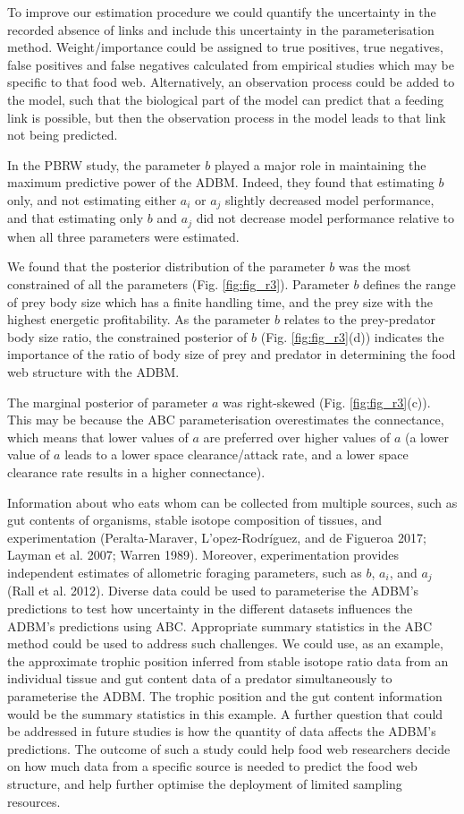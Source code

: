 \documentclass{article}
\begin{document}
To improve our estimation procedure we could quantify the uncertainty in
the recorded absence of links and include this uncertainty in the
parameterisation method. Weight/importance could be assigned to true
positives, true negatives, false positives and false negatives
calculated from empirical studies which may be specific to that food
web. Alternatively, an observation process could be added to the model,
such that the biological part of the model can predict that a feeding
link is possible, but then the observation process in the model leads to
that link not being predicted.

In the PBRW study, the parameter \(b\) played a major role in
maintaining the maximum predictive power of the ADBM. Indeed, they found
that estimating \(b\) only, and not estimating either \(a_i\) or \(a_j\)
slightly decreased model performance, and that estimating only \(b\) and
\(a_j\) did not decrease model performance relative to when all three
parameters were estimated.

We found that the posterior distribution of the parameter \(b\) was the
most constrained of all the parameters (Fig. \ref{fig:fig_r3}).
Parameter \(b\) defines the range of prey body size which has a finite
handling time, and the prey size with the highest energetic
profitability. As the parameter \(b\) relates to the prey-predator body
size ratio, the constrained posterior of \(b\) (Fig.
\ref{fig:fig_r3}(d)) indicates the importance of the ratio of body size
of prey and predator in determining the food web structure with the
ADBM.

The marginal posterior of parameter \(a\) was right-skewed (Fig.
\ref{fig:fig_r3}(c)). This may be because the ABC parameterisation
overestimates the connectance, which means that lower values of \(a\)
are preferred over higher values of \(a\) (a lower value of \(a\) leads
to a lower space clearance/attack rate, and a lower space clearance rate
results in a higher connectance).

Information about who eats whom can be collected from multiple sources,
such as gut contents of organisms, stable isotope composition of
tissues, and experimentation (Peralta-Maraver, L'opez-Rodríguez, and de
Figueroa 2017; Layman et al. 2007; Warren 1989). Moreover,
experimentation provides independent estimates of allometric foraging
parameters, such as \(b\), \(a_i\), and \(a_j\) (Rall et al. 2012).
Diverse data could be used to parameterise the ADBM's predictions to
test how uncertainty in the different datasets influences the ADBM's
predictions using ABC. Appropriate summary statistics in the ABC method
could be used to address such challenges. We could use, as an example,
the approximate trophic position inferred from stable isotope ratio data
from an individual tissue and gut content data of a predator
simultaneously to parameterise the ADBM. The trophic position and the
gut content information would be the summary statistics in this example.
A further question that could be addressed in future studies is how the
quantity of data affects the ADBM's predictions. The outcome of such a
study could help food web researchers decide on how much data from a
specific source is needed to predict the food web structure, and help
further optimise the deployment of limited sampling resources.
\end{document}
